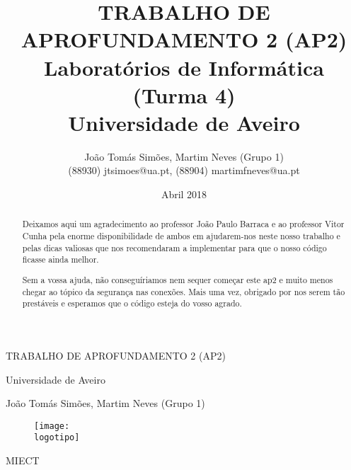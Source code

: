 \documentclass[a4paper]{report}
\begin{document}
\def\titulo{TRABALHO DE APROFUNDAMENTO 2 (AP2)}
\def\data{Abril 2018}
\def\autores{João Tomás Simões, Martim Neves (Grupo 1)}
\def\autorescontactos{(88930) jtsimoes@ua.pt, (88904) martimfneves@ua.pt}
\def\versao{MIECT}
\def\departamento{Laboratórios de Informática (Turma 4)}
\def\empresa{Universidade de Aveiro}
\def\logotipo{ua.pdf}

\begin{titlepage}

\begin{center}

\vspace*{50mm}

{\Huge \titulo}\\ 

\vspace{10mm}

{\Large \empresa}\\

\vspace{10mm}

{\LARGE \autores}\\ 

\vspace{30mm}

\begin{figure}[h]
\center
\texttt{[image: \\logotipo]}
\end{figure}

\vspace{30mm}
\end{center}

\begin{flushright}
\versao
\end{flushright}
\end{titlepage}

\title{
{\Huge\textbf{\titulo}}\\
\vspace{3mm}
{\Large \departamento\\ \empresa}
}

\author{
\autores \\
\autorescontactos
}

\date{\data}

\maketitle


\renewcommand{\abstractname}{Agradecimentos}
\begin{abstract}

Deixamos aqui um agradecimento ao professor João Paulo Barraca e ao professor Vitor Cunha pela enorme disponibilidade de ambos em ajudarem-nos neste nosso trabalho e pelas dicas valiosas que nos recomendaram a implementar para que o nosso código ficasse ainda melhor. 

Sem a vossa ajuda, não conseguíriamos nem sequer começar este \ac{ap2} e muito menos chegar ao tópico da segurança nas conexões.
Mais uma vez, obrigado por nos serem tão prestáveis e esperamos que o código esteja do vosso agrado.

\end{abstract}
\end{document}
